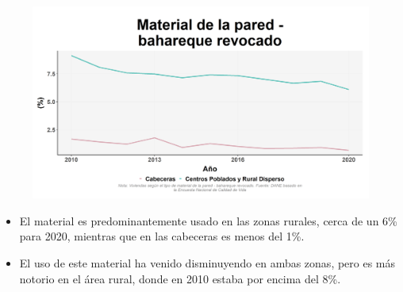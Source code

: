     \begin{figure}[H]
        \caption[Viviendas con pared de bahareque revocado por zonas ]{\label{pared_bahareque_revo_zonas} }
        \begin{center}
        \includegraphics[width=\textwidth,keepaspectratio]{img/var_155_trend.png}
        \end{center}
    \end{figure}
            \begin{itemize}
                    \item El material es predominantemente usado en las zonas rurales, cerca de un 6\% para 2020, mientras que en las cabeceras es menos del 1\%.
                    \item El uso de este material ha venido disminuyendo en ambas zonas, pero es más notorio en el área rural, donde en 2010 estaba por encima del 8\%.
                    \end{itemize}

